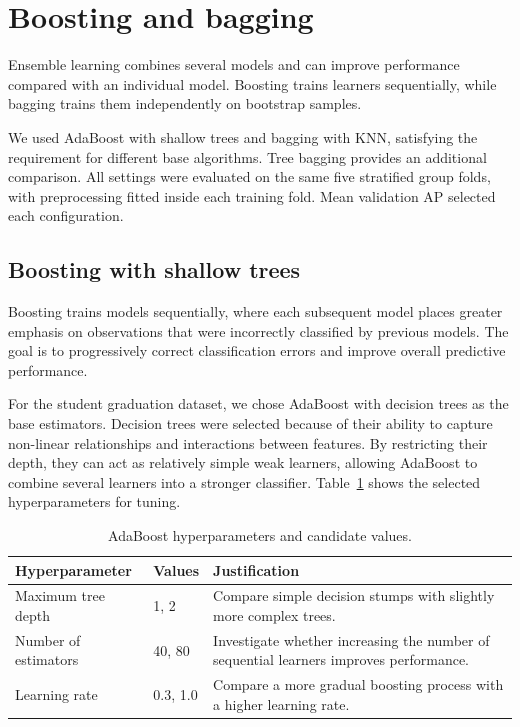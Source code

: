 \section{Boosting and bagging}
\label{sec:boosting-bagging}

Ensemble learning combines several models and can improve performance compared
with an individual model. Boosting trains learners sequentially, while bagging
trains them independently on bootstrap samples.

We used AdaBoost with shallow trees and bagging with KNN, satisfying the
requirement for different base algorithms. Tree bagging provides an additional
comparison. All settings were evaluated on the same five stratified group
folds, with preprocessing fitted inside each training fold. Mean validation AP
selected each configuration.

\subsection{Boosting with shallow trees}

Boosting trains models sequentially, where each subsequent model places greater emphasis on observations that were incorrectly classified by previous models. The goal is to progressively correct classification errors and improve overall predictive performance.

For the student graduation dataset, we chose AdaBoost with decision trees as the base estimators. Decision trees were selected because of their ability to capture non-linear relationships and interactions between features. By restricting their depth, they can act as relatively simple weak learners, allowing AdaBoost to combine several learners into a stronger classifier. Table~\ref{tab:adaboost-hyperparameters} shows the selected hyperparameters for tuning.

\begin{table}[H]
    \centering
    \caption[AdaBoost tuning grid]{AdaBoost hyperparameters and candidate values.}
    \label{tab:adaboost-hyperparameters}
    \begin{tabularx}{\linewidth}{@{}l l X@{}}
        \hline
        \textbf{Hyperparameter} & \textbf{Values} & \textbf{Justification} \\
        \hline
        Maximum tree depth & 1, 2 &
        Compare simple decision stumps with slightly more complex trees. \\

        Number of estimators & 40, 80 &
        Investigate whether increasing the number of sequential learners improves performance. \\

        Learning rate & 0.3, 1.0 &
        Compare a more gradual boosting process with a higher learning rate. \\
        \hline
    \end{tabularx}
\end{table}


